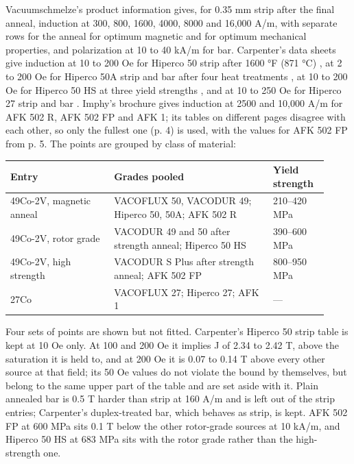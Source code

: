 \documentclass[
  11pt,
]{article}
\begin{document}
Vacuumschmelze's product information \cite{vac2021} gives, for 0.35 mm strip after the final anneal, induction at 300, 800, 1600, 4000, 8000 and 16,000 A/m, with separate rows for the anneal for optimum magnetic and for optimum mechanical properties, and polarization at 10 to 40 kA/m for bar. Carpenter's data sheets give induction at 10 to 200 Oe for Hiperco 50 strip after 1600 °F (871 °C) \cite{carpenter-h50}, at 2 to 200 Oe for Hiperco 50A strip and bar after four heat treatments \cite{carpenter-h50a}, at 10 to 200 Oe for Hiperco 50 HS at three yield strengths \cite{carpenter-h50hs}, and at 10 to 250 Oe for Hiperco 27 strip and bar \cite{carpenter-h27}. Imphy's brochure \cite{imphy} gives induction at 2500 and 10,000 A/m for AFK 502 R, AFK 502 FP and AFK 1; its tables on different pages disagree with each other, so only the fullest one (p. 4) is used, with the values for AFK 502 FP from p. 5. The points are grouped by class of material:

\begin{center}
\begin{tabular}{p{0.30\linewidth}p{0.46\linewidth}p{0.16\linewidth}}
\toprule
Entry & Grades pooled & Yield strength \\
\midrule
49Co-2V, magnetic anneal & VACOFLUX 50, VACODUR 49; Hiperco 50, 50A; AFK 502 R & 210--420 MPa \\
49Co-2V, rotor grade & VACODUR 49 and 50 after strength anneal; Hiperco 50 HS & 390--600 MPa \\
49Co-2V, high strength & VACODUR S Plus after strength anneal; AFK 502 FP & 800--950 MPa \\
27Co & VACOFLUX 27; Hiperco 27; AFK 1 & --- \\
\bottomrule
\end{tabular}
\end{center}

Four sets of points are shown but not fitted. Carpenter's Hiperco 50 strip table is kept at 10 Oe only. At 100 and 200 Oe it implies J of 2.34 to 2.42 T, above the saturation it is held to, and at 200 Oe it is 0.07 to 0.14 T above every other source at that field; its 50 Oe values do not violate the bound by themselves, but belong to the same upper part of the table and are set aside with it. Plain annealed bar is 0.5 T harder than strip at 160 A/m and is left out of the strip entries; Carpenter's duplex-treated bar, which behaves as strip, is kept. AFK 502 FP at 600 MPa sits 0.1 T below the other rotor-grade sources at 10 kA/m, and Hiperco 50 HS at 683 MPa sits with the rotor grade rather than the high-strength one.
\end{document}
